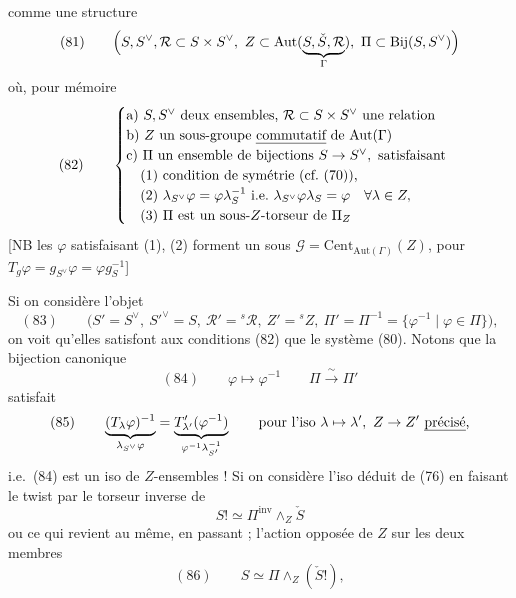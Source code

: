 \documentclass[11pt,a4paper]{article}
\begin{document}
comme une structure
\[
(81)\qquad \Bigl(S, S^{\vee}, \mathcal{R} \subset S \times S^{\vee},\ Z \subset \mathrm{Aut}(\underbrace{S, \check{S}, \mathcal{R}}_{\Gamma}),\ \Pi \subset \mathrm{Bij}(S, S^{\vee})\Bigr)
\]
où, pour mémoire
\[
(82)\qquad
\begin{cases}
\text{a) } S, S^{\vee} \text{ deux ensembles, } \mathcal{R} \subset S \times S^{\vee} \text{ une relation} \\
\text{b) } Z \text{ un sous-groupe \emph{commutatif} de } \mathrm{Aut}(\Gamma) \\
\text{c) } \Pi \text{ un ensemble de bijections } S \to S^{\vee}, \text{ satisfaisant} \\
\quad \text{(1) condition de symétrie (cf.\ (70)),} \\
\quad \text{(2) } \lambda_{S^{\vee}} \varphi = \varphi \lambda_S^{-1} \text{ i.e.\ } \lambda_{S^{\vee}} \varphi \lambda_S = \varphi \quad \forall \lambda \in Z, \\
\quad \text{(3) } \Pi \text{ est un sous-}Z\text{-torseur de } \Pi_Z
\end{cases}
\]
 [NB les $\varphi$ satisfaisant (1), (2) forment un
  sous
$\mathcal{G} = \mathrm{Cent}_{\mathrm{Aut}(\Gamma)}(Z)$, pour
$T_g \varphi = g_{S^{\vee}} \varphi = \varphi g_S^{-1}$]
\struck{\ill{} \ill{}}

Si on considère l'objet
\[
(83)\qquad \bigl(S' = S^{\vee},\ S'^{\vee} = S,\ \mathcal{R}' = {}^{s}\mathcal{R},\ Z' = {}^{s}Z,\ \Pi' = \Pi^{-1} = \{\varphi^{-1} \mid \varphi \in \Pi\}\bigr),
\]
on voit qu'elles satisfont aux conditions (82) que le système  (80). Notons que la bijection
canonique
\[
(84)\qquad \varphi \longmapsto \varphi^{-1} \qquad \Pi \xrightarrow{\ \sim\ } \Pi'
\]
satisfait
\[
(85)\qquad \underbrace{(T_\lambda \varphi)^{-1}}_{\lambda_{S^{\vee}} \varphi} = \underbrace{T'_{\lambda'}(\varphi^{-1})}_{\varphi^{-1} \lambda_{S'}^{-1}}
\qquad \text{pour l'iso } \lambda \mapsto \lambda',\ Z \to Z' \text{ \uncertain{précisé},}
\]
i.e.\ (84) est \struck{\ill{}} un iso de $Z$-ensembles ! Si on considère
l'iso déduit de (76) en \struck{\ill{}} faisant le twist par
\struck{$\Pi$} \add{$\Lambda(\varphi)$} le torseur inverse de
\struck{$\Pi$}
\[
S! \simeq \Pi^{\mathrm{inv}} \wedge_Z \check{S}
\]
ou ce qui revient au même, en passant ; l'action
opposée de $Z$ sur les deux membres
\[
(86)\qquad S \simeq \Pi \wedge_Z (\check{S}!) ,
\]
\end{document}
